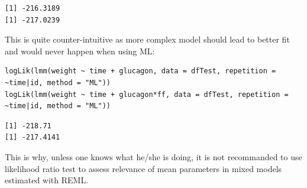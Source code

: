 \documentclass[12pt]{article}
\begin{document}
\begin{verbatim}
[1] -216.3189
[1] -217.0239
\end{verbatim}


This is quite counter-intuitive as more complex model should lead to
better fit and would never happen when using ML:
\lstset{language=r,label= ,caption= ,captionpos=b,numbers=none}
\begin{lstlisting}
logLik(lmm(weight ~ time + glucagon, data = dfTest, repetition = ~time|id, method = "ML"))
logLik(lmm(weight ~ time + glucagon*ff, data = dfTest, repetition = ~time|id, method = "ML"))
\end{lstlisting}

\begin{verbatim}
[1] -218.71
[1] -217.4141
\end{verbatim}


This is why, unless one knows what he/she is doing, it is not
recommanded to use likelihood ratio test to assess relevance of mean
parameters in mixed models estimated with REML.

\clearpage
\end{document}
